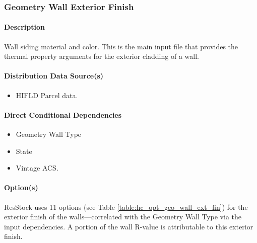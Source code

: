 \subsubsection{Geometry Wall Exterior Finish}\label{geometry_wall_exterior_finish}
\paragraph{Description}
Wall siding material and color. This is the main input file that provides the thermal property arguments for the exterior cladding of a wall.
\paragraph{Distribution Data Source(s)}
\begin{itemize}
 
\item
  HIFLD Parcel data.
\end{itemize}
\paragraph{Direct Conditional Dependencies}
 
\begin{itemize}
    \item Geometry Wall Type
    \item State
    \item Vintage ACS.
\end{itemize}
\paragraph{Option(s)}
ResStock uses 11 options (see Table \ref{table:hc_opt_geo_wall_ext_fin}) for the exterior finish of the walls---correlated with the Geometry Wall Type via the input dependencies. A portion of the wall R-value is attributable to this exterior finish.

